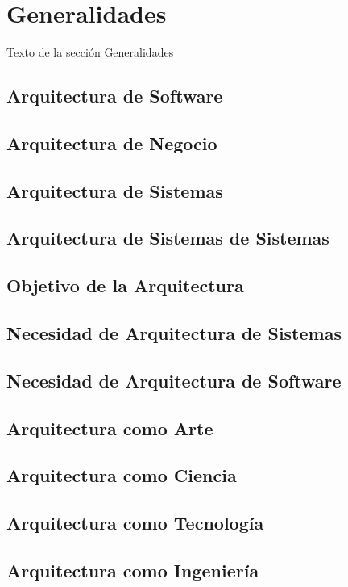 
\section{Generalidades}

Texto de la sección Generalidades

\subsection{Arquitectura de Software}
\subsection{Arquitectura de Negocio}
\subsection{Arquitectura de Sistemas}
\subsection{Arquitectura de Sistemas de Sistemas}
\subsection{Objetivo de la Arquitectura}
\subsection{Necesidad de Arquitectura de Sistemas}
\subsection{Necesidad de Arquitectura de Software}
\subsection{Arquitectura como Arte}
\subsection{Arquitectura como Ciencia}
\subsection{Arquitectura como Tecnología}
\subsection{Arquitectura como Ingeniería}
